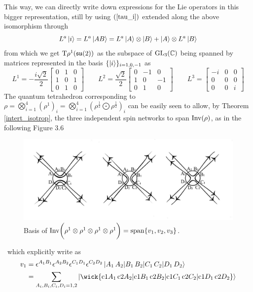 This way, we can directly write down expressions for the Lie operators in this bigger representation, still by using $(\ref{tau_i})$  extended along the above isomorphism through
$$L^a\left| i \right >=L^a\left| AB \right >=L^a\left| A \right >\otimes\left| B \right >+\left| A \right >\otimes L^a\left| B \right >$$
from which we get $\text{\normalfont T}\rho^1(\mathfrak{su}(2))$ as the subspace of $\text{\normalfont GL}_3(\mathbb{C})$ being spanned by matrices represented in the basis $\{\left| i \right >\}_{i=1,0,-1}$ as
$$L^1=-\frac{i\sqrt{2}}{2}\begin{bmatrix}
    0&1&0\\
    1&0&1\\
    0&1&0
\end{bmatrix}\qquad L^2=\frac{\sqrt{2}}{2}\begin{bmatrix}
    0&-1&0\\
    1&0&-1\\
    0&1&0
\end{bmatrix}\qquad L^3=\begin{bmatrix}
    -i&0&0\\
    0&0&0\\
    0&0&i
\end{bmatrix}$$
The quantum tetrahedron corresponding to $\rho=\bigotimes_{i=1}^4(\rho^1)_i=\bigotimes_{i=1}^4(\rho^{\frac{1}{2}}\bigodot\rho^{\frac{1}{2}})_i$ can be easily seen to allow, by Theorem \ref{intert_isotrop}, the three independent spin networks to span $\text{\normalfont Inv}(\rho)$, as in the following Figure 3.6
\begin{figure}[ht]
    \centering
    \includegraphics[scale=0.3]{images/3_isotr.jpeg}
    \caption{Basis of $\text{\normalfont Inv}\bigg(\rho^1\otimes\rho^1\otimes\rho^1\otimes\rho^1\bigg)=\operatorname{span}\{v_1,v_2,v_3\}$.}
\end{figure}
\,\newline
which explicitly write as
\begin{align*}
    v_1&=\epsilon^{A_1B_1}\epsilon^{A_2B_2}\epsilon^{C_1D_1}\epsilon^{C_2D_2}\ket{A_1\,A_2|B_1\,B_2|C_1\,C_2|D_1\,D_2}\\
    &=\sum_{A_i,B_i,C_i,D_i=1,2}\ket{\wick{\c1{A_1}\,\c2{A_2}|\c1{B_1}\,\c2{B_2}|\c1{C_1}\,\c2{C_2}|\c1{D_1}\,\c2{D_2}}}
\end{align*}
